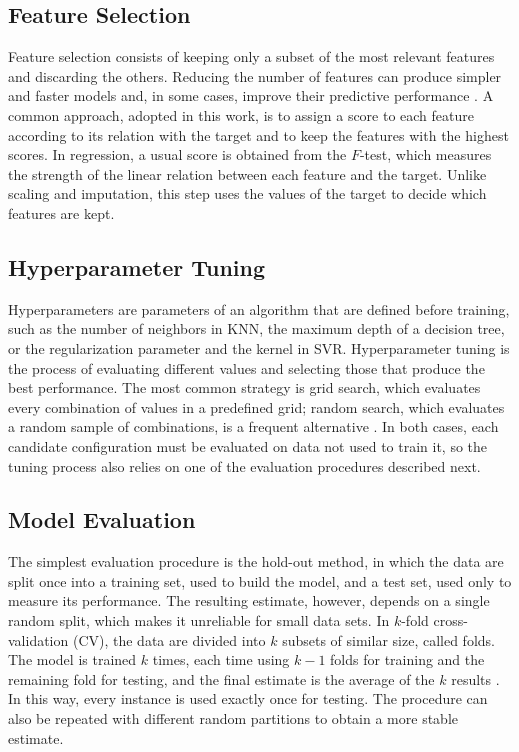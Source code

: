 \subsection{Feature Selection}

Feature selection consists of keeping only a subset of the most relevant
features and discarding the others. Reducing the number of features can produce
simpler and faster models and, in some cases, improve their predictive
performance \cite{guyon2003}. A common approach, adopted in this work, is to
assign a score to each feature according to its relation with the target and to
keep the features with the highest scores. In regression, a usual score is
obtained from the $F$-test, which measures the strength of the linear relation
between each feature and the target. Unlike scaling and imputation, this step
uses the values of the target to decide which features are kept.

\subsection{Hyperparameter Tuning}

Hyperparameters are parameters of an algorithm that are defined before training,
such as the number of neighbors in KNN, the maximum depth of a decision tree, or
the regularization parameter and the kernel in SVR. Hyperparameter tuning is the
process of evaluating different values and selecting those that produce the best
performance. The most common strategy is grid search, which evaluates every
combination of values in a predefined grid; random search, which evaluates a
random sample of combinations, is a frequent alternative \cite{bergstra2012}. In
both cases, each candidate configuration must be evaluated on data not used to
train it, so the tuning process also relies on one of the evaluation procedures
described next.

\subsection{Model Evaluation}

The simplest evaluation procedure is the hold-out method, in which the data are
split once into a training set, used to build the model, and a test set, used
only to measure its performance. The resulting estimate, however, depends on a
single random split, which makes it unreliable for small data sets. In $k$-fold
cross-validation (CV), the data are divided into $k$ subsets of similar size,
called folds. The model is trained $k$ times, each time using $k-1$ folds for
training and the remaining fold for testing, and the final estimate is the
average of the $k$ results \cite{kohavi1995,hastie2009}. In this way, every
instance is used exactly once for testing. The procedure can also be repeated
with different random partitions to obtain a more stable estimate.

